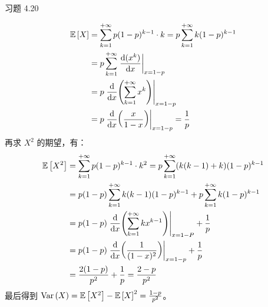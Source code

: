 \begin{problem}
    习题 4.20
    \begin{solution}
        $$
        \begin{aligned}
            \expect{X} & = \sum_{k = 1}^{+ \infty} p (1 - p)^{k - 1} \cdot k = p \sum_{k = 1}^{+\infty} k (1 - p)^{k - 1} \\
            & = p \sum_{k = 1}^{+ \infty} \eval{\dv{(x^{k})}{x}}_{x = 1 - p} \\
            & = p \eval{\dv{x}(\sum_{k = 1}^{+\infty} x^{k})}_{x = 1 - p} \\
            & = p \eval{\dv{x}(\frac{x}{1 - x})}_{x = 1 - p} = \frac{1}{p}
        \end{aligned}
        $$
        再求 $X^2$ 的期望，有：
        $$
        \begin{aligned}
            \expect{X^2} & = \sum_{k = 1}^{+ \infty} p (1 - p)^{k - 1} \cdot k^2 = p \sum_{k = 1}^{+ \infty} (k (k - 1) + k) (1 - p)^{k - 1} \\
            & = p (1 - p) \sum_{k = 1}^{+ \infty} k (k - 1) (1 - p)^{k - 1} + p \sum_{k = 1}^{+ \infty} k (1 - p)^{k - 1} \\
            & = p (1 - p) \eval{\dv{x}(\sum_{k = 1}^{+ \infty} k x^{k - 1})}_{x = 1 - P} + \frac{1}{p} \\
            & = p (1 - p) \eval{\dv{x}(\frac{1}{(1 - x)^2})}_{x = 1 - p} + \frac{1}{p} \\
            & = \frac{2 (1 - p)}{p^2} + \frac{1}{p} = \frac{2 - p}{p^2}
        \end{aligned}
        $$
        最后得到 $\operatorname{Var}\left(X\right) = \operatorname{\mathbb{E}}\left[X^2\right] - \operatorname{\mathbb{E}}\left[X\right]^2 = \frac{1 - p}{p^2}$。
    \end{solution}
\end{problem}